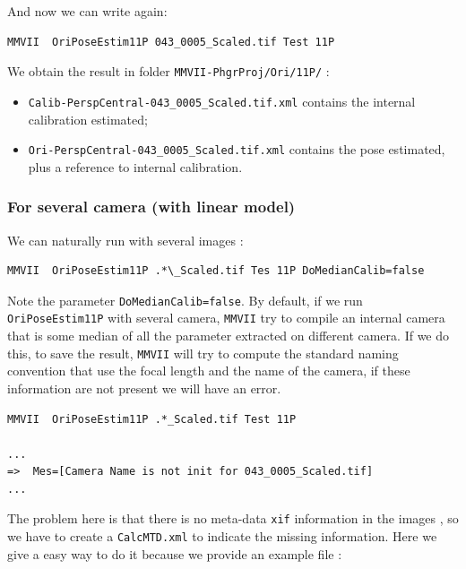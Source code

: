 And now we can write again:

\begin{lstlisting}
MMVII  OriPoseEstim11P 043_0005_Scaled.tif Test 11P
\end{lstlisting}

We obtain the result in folder {\tt MMVII-PhgrProj/Ori/11P/} :

\begin{itemize}
	\item {\tt Calib-PerspCentral-043\_0005\_Scaled.tif.xml} contains the internal calibration estimated;
	\item {\tt Ori-PerspCentral-043\_0005\_Scaled.tif.xml} contains the pose estimated, plus a reference to internal calibration.
\end{itemize}

\label{Resec1PPPerIm}


\subsubsection{For several camera (with linear model)}

We can naturally run with several images :

\begin{lstlisting}
MMVII  OriPoseEstim11P .*\_Scaled.tif Tes 11P DoMedianCalib=false
\end{lstlisting}

Note the parameter {\tt DoMedianCalib=false}. By default, if we run  {\tt OriPoseEstim11P}
with several camera, {\tt MMVII} try to compile an internal camera that is some median of 
all the parameter extracted on different camera.  If we do this, to save the result, {\tt MMVII}
will try to compute the standard naming convention that use the focal length and
the name of the camera, if these information are not present we will have an error.

\begin{lstlisting}
MMVII  OriPoseEstim11P .*_Scaled.tif Test 11P

...
=>  Mes=[Camera Name is not init for 043_0005_Scaled.tif]
...
\end{lstlisting}


The problem here is that there is no meta-data {\tt xif} information in the images , so we have to
create a {\tt CalcMTD.xml} to indicate the missing information.
Here we give a easy way to do it because we provide an example file : 

